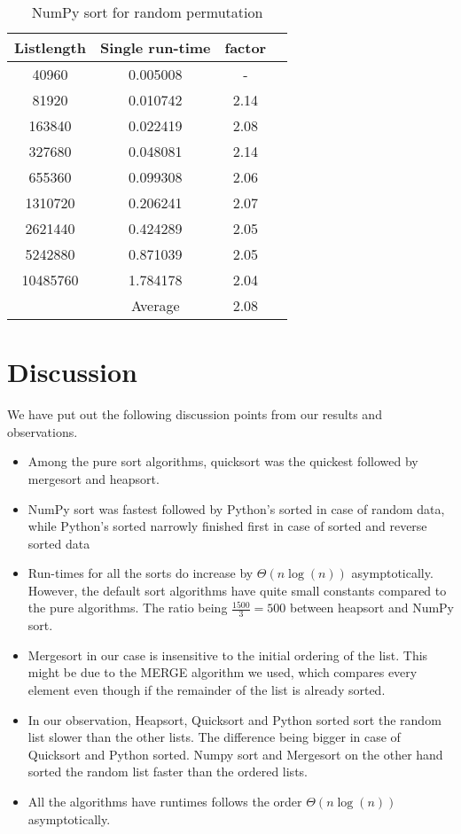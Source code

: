 \documentclass[sigconf, nonacm, natbib, screen, balance=False]{acmart}
\begin{document}
\begin{table}[ht]
\caption{NumPy sort for random permutation }
\label{tab:table3}
\begin{center}
\begin{tabular}{|c|c|c|c|} 
\hline
\textbf{Listlength} & 	\textbf{Single run-time} & \textbf{factor} \\ 
\hline
	40960 & 	0.005008 & 	- \\ 
	81920 & 	0.010742 & 	2.14 \\ 
	163840 & 	0.022419 & 	2.08 \\ 
	327680 & 	0.048081 & 	2.14 \\ 
	655360 & 	0.099308 & 	2.06 \\ 
	1310720 & 	0.206241 & 	2.07 \\ 
	2621440 & 	0.424289 & 	2.05 \\ 
	5242880 & 	0.871039 & 	2.05 \\ 
	10485760 & 	1.784178 & 	2.04 \\ 
\hline
	 & 	Average & 	2.08 \\ 	
\hline
\end{tabular}
\end{center}
\end{table}

\section{Discussion}\label{sec:discussion}
We have put out the following discussion points from our results and observations.

\begin{itemize}
\item Among the pure sort algorithms, quicksort was the quickest followed by mergesort and heapsort.
\item NumPy sort was fastest followed by Python's sorted in case of random data, while Python's sorted narrowly finished first in case of sorted and reverse sorted data
\item Run-times for all the sorts do increase by $\Theta \left(n\log\left(n\right)\right)$ asymptotically. However, the default sort algorithms have quite small constants compared to the pure algorithms. The ratio being $\frac{1500}{3} = 500$ between heapsort and NumPy sort.
\item Mergesort in our case is insensitive to the initial ordering of the list. This might be due to the MERGE algorithm we used, which compares every element even though if the remainder of the list is already sorted.
\item In our observation, Heapsort, Quicksort and Python sorted sort the random list slower than the other lists. The difference being bigger in case of Quicksort and Python sorted. Numpy sort and Mergesort on the other hand sorted the random list faster than the ordered lists. 
\item All the algorithms have runtimes follows the order
$\Theta \left(n\log\left(n\right)\right)$ asymptotically.
\end{itemize}
\end{document}
